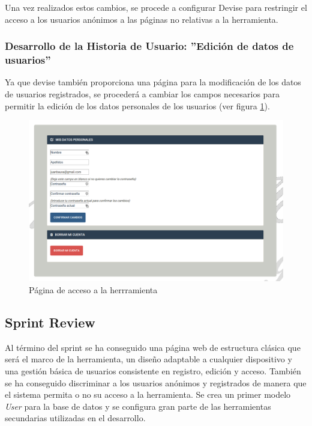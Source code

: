 	Una vez realizados estos cambios, se procede a configurar Devise para restringir el acceso a los usuarios anónimos a las páginas no relativas a la herramienta.
		
	\subsubsection{Desarrollo de la Historia de Usuario: ''Edición de datos de usuarios'' }
	Ya que devise también proporciona una página para la modificación de los datos de usuarios registrados, se procederá a cambiar los campos necesarios para permitir la edición de los datos personales de los usuarios (ver figura \ref{fig:edicion_usuarios}).
	
	\begin{figure}[H]
		\centering
		\includegraphics[width=15cm, fbox={\fboxrule} 4mm]{images/05-resultados/12-edicion_usuarios.png}
		\caption{Página de acceso a la herrramienta}
		\label{fig:edicion_usuarios}
	\end{figure}
	
	\subsection{Sprint Review}
	Al término del sprint se ha conseguido una página web de estructura clásica que será el marco de la herramienta, un diseño adaptable a cualquier dispositivo y una gestión básica de usuarios consistente en registro, edición y acceso. También se ha conseguido discriminar a los usuarios anónimos y registrados de manera que el sistema permita o no su acceso a la herramienta. Se crea un primer modelo \textit{User} para la base de datos y se configura gran parte de las herramientas secundarias utilizadas en el desarrollo.

